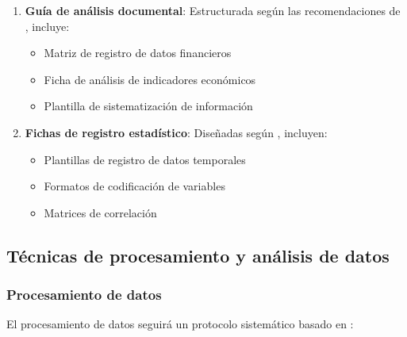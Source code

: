 \documentclass[12pt, a4paper]{article}
\begin{document}
\begin{enumerate}
    \item \textbf{Guía de análisis documental}:
    Estructurada según las recomendaciones de \textcite{Scott2023}, incluye:
    \begin{itemize}
        \item Matriz de registro de datos financieros
        \item Ficha de análisis de indicadores económicos
        \item Plantilla de sistematización de información
    \end{itemize}

    \item \textbf{Fichas de registro estadístico}:
    Diseñadas según \textcite{Anderson2023}, incluyen:
    \begin{itemize}
        \item Plantillas de registro de datos temporales
        \item Formatos de codificación de variables
        \item Matrices de correlación
    \end{itemize}
\end{enumerate}

\subsection{Técnicas de procesamiento y análisis de datos}

\subsubsection{Procesamiento de datos}

El procesamiento de datos seguirá un protocolo sistemático basado en \textcite{Miles2023}:
\end{document}
